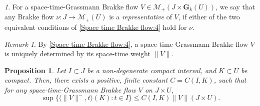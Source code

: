 \documentclass{article}
\theoremstyle{plain}
\theoremstyle{definition}
\theoremstyle{plain}
\newtheorem{proposition}[theorem]{Proposition}
\theoremstyle{remark}
\newtheorem{propparagraph}[theorem]{}
\theoremstyle{remark}
\newtheorem{remark}[theorem]{Remark}
\theoremstyle{plain}
\begin{document}
\begin{propparagraph}\label{proppara: def of representative Brakke Flow}
    For a space-time-Grassmann Brakke flow $V \in \mathscr{M}_{+} (J \times \mathbf{G}_{k} (U))$, we say that any Brakke flow $\nu \colon J \rightarrow \mathscr{M}_{+} (U)$ is a \textit{representative} of $V$, if either of the two equivalent conditions of \ref{Space time Brakke flow:4} hold for $\nu$.
\end{propparagraph}

\begin{remark}
    By \ref{Space time Brakke flow:4}, a space-time-Grassmann Brakke flow $V$ is uniquely determined by its space-time weight $\| V \|$.
\end{remark}




\begin{proposition}\label{proppara: L1 to L infinity mass bound}
    Let $I \subset J$ be a non-degenerate compact interval, and $K \subset U$ be compact. 
    Then, there exists a positive, finite constant $C = C (I, K)$, such that for any space-time-Grassmann Brakke flow $V$ on $J \times U$, 
    \begin{equation*}
        \sup \{ \langle \| V \|^{-}, t \rangle (K) \colon t \in I \} \leq C (I, K) \| V \| (J \times U).
    \end{equation*}
\end{proposition}
\end{document}
